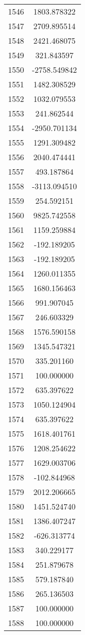 \documentclass[12pt]{article}
\begin{document}
\begin{longtable}{@{}cc@{}}
1546 & 1803.878322 \\
1547 & 2709.895514 \\
1548 & 2421.468075 \\
1549 & 321.843597 \\
1550 & -2758.549842 \\
1551 & 1482.308529 \\
1552 & 1032.079553 \\
1553 & 241.862544 \\
1554 & -2950.701134 \\
1555 & 1291.309482 \\
1556 & 2040.474441 \\
1557 & 493.187864 \\
1558 & -3113.094510 \\
1559 & 254.592151 \\
1560 & 9825.742558 \\
1561 & 1159.259884 \\
1562 & -192.189205 \\
1563 & -192.189205 \\
1564 & 1260.011355 \\
1565 & 1680.156463 \\
1566 & 991.907045 \\
1567 & 246.603329 \\
1568 & 1576.590158 \\
1569 & 1345.547321 \\
1570 & 335.201160 \\
1571 & 100.000000 \\
1572 & 635.397622 \\
1573 & 1050.124904 \\
1574 & 635.397622 \\
1575 & 1618.401761 \\
1576 & 1208.254622 \\
1577 & 1629.003706 \\
1578 & -102.844968 \\
1579 & 2012.206665 \\
1580 & 1451.524740 \\
1581 & 1386.407247 \\
1582 & -626.313774 \\
1583 & 340.229177 \\
1584 & 251.879678 \\
1585 & 579.187840 \\
1586 & 265.136503 \\
1587 & 100.000000 \\
1588 & 100.000000 \\

\end{longtable}
\end{document}
